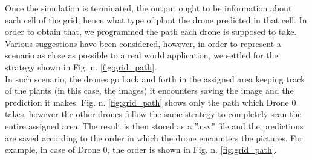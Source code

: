\documentclass[english]{lni}
\begin{document}
Once the simulation is terminated, the output ought to be information about each cell of the grid, hence what type of plant the drone predicted in that cell. In order to obtain that, we  programmed the path each drone is supposed to take. Various suggestions have been considered, however, in order to represent a scenario as close as possible to a real world application, we settled for the strategy shown in Fig. n. \ref{fig:grid_path}. \\
In such scenario, the drones go back and forth in the assigned area 
keeping track of the plants (in this case, the images) it encounters saving the image and the prediction it makes. Fig. n. \ref{fig:grid_path} shows only the path which Drone 0 takes, however the other drones follow the same strategy to completely scan the entire assigned area. The result is then stored as a ''.csv'' file and the predictions are saved according to the order in which the drone encounters the pictures. For example, in case of Drone 0, the order is shown in Fig. n. \ref{fig:grid_path}. 
\end{document}
